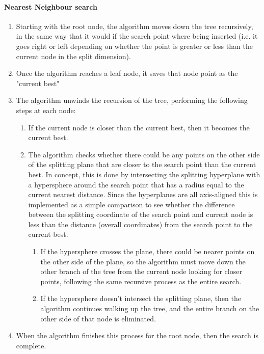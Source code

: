\documentclass[a4paper,10pt,oneside]{report}
\begin{document}
\paragraph{Nearest Neighbour search}
\begin{enumerate}

   \item Starting with the root node, the algorithm moves down the tree recursively, in the same way that it would if the search point where being inserted (i.e. it goes right or left depending on whether the point is greater or less than the current node in the split dimension).
   \item Once the algorithm reaches a leaf node, it saves that node point as the "current best"
   \item The algorithm unwinds the recursion of the tree, performing the following steps at each node:
         \begin{enumerate}

		\item If the current node is closer than the current best, then it becomes the current best.
		\item The algorithm checks whether there could be any points on the other side of the splitting plane that are closer to the search point than the current best. In concept, this is done by intersecting the splitting hyperplane with a hypersphere around the search point that has a radius equal to the current nearest distance. Since the hyperplanes are all axis-aligned this is implemented as a simple comparison to see whether the difference between the splitting coordinate of the search point and current node is less than the distance (overall coordinates) from the search point to the current best.
                \begin{enumerate}
			\item If the hypersphere crosses the plane, there could be nearer points on the other side of the plane, so the algorithm must move down the other branch of the tree from the current node looking for closer points, following the same recursive process as the entire search.
              		\item If the hypersphere doesn't intersect the splitting plane, then the algorithm continues walking up the tree, and the entire branch on the other side of that node is eliminated.
		\end{enumerate}	
         \end{enumerate}
   \item When the algorithm finishes this process for the root node, then the search is complete.
\end{enumerate}
\end{document}
